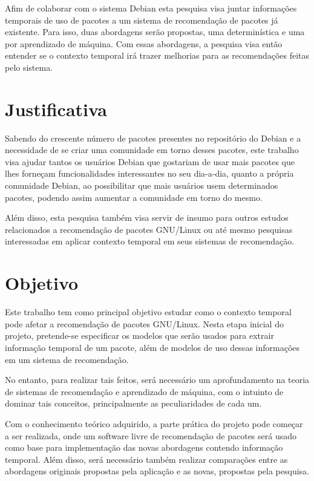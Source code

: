 Afim de colaborar com o sistema Debian esta pesquisa visa juntar informações
temporais de uso de pacotes a um sistema de recomendação de pacotes já existente.
Para isso, duas abordagens serão propostas, uma determinística e uma por aprendizado
de máquina. Com essas abordagens, a pesquisa visa então entender se o contexto temporal
irá trazer melhorias para as recomendações feitas pelo sistema.

\section{Justificativa}

Sabendo do crescente número de pacotes presentes no repositório do Debian e a
necessidade de se criar uma comunidade em torno desses pacotes, este trabalho
visa ajudar tantos os usuários Debian que gostariam de usar mais pacotes que
lhes forneçam funcionalidades interessantes no seu dia-a-dia, quanto a própria
comunidade Debian, ao possibilitar que mais usuários usem determinados pacotes,
podendo assim aumentar a comunidade em torno do mesmo.

Além disso, esta pesquisa também visa servir de insumo para outros estudos
relacionados a recomendação de pacotes GNU/Linux ou até mesmo pesquisas
interessadas em aplicar contexto temporal em seus sistemas de recomendação.

\section{Objetivo}

Este trabalho tem como principal objetivo estudar como o contexto temporal pode
afetar a recomendação de pacotes GNU/Linux. Nesta etapa inicial do projeto,
pretende-se especificar os modelos que serão usados para extrair informação
temporal de um pacote, além de modelos de uso dessas informações em um sistema
de recomendação.

No entanto, para realizar tais feitos, será necessário um aprofundamento na
teoria de sistemas de recomendação e aprendizado de máquina, com o intuinto de
dominar tais conceitos, principalmente as peculiaridades de cada um.

Com o conhecimento teórico adquirido, a parte prática do projeto pode começar a
ser realizada, onde um software livre de recomendação de pacotes será usado como
base para implementação das novas abordagens contendo informação temporal. Além
disso, será necessário também realizar comparações entre as abordagens originais
propostas pela aplicação e as novas, propostas pela pesquisa.

